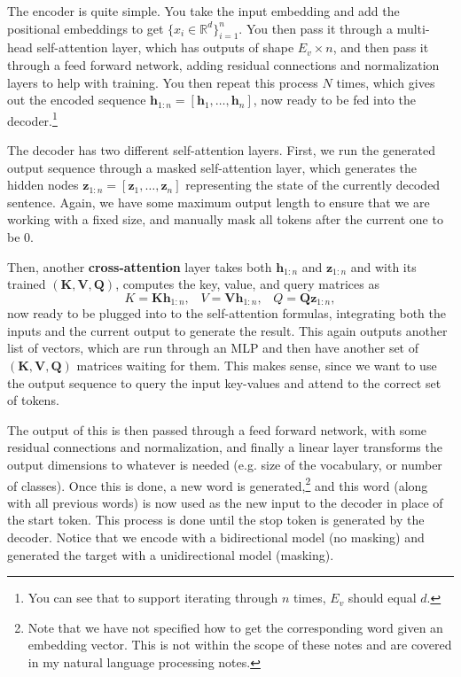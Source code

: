 \documentclass{article}
\begin{document}
      The encoder is quite simple. You take the input embedding and add the positional embeddings to get $\{x_i \in \mathbb{R}^d\}_{i=1}^n$. You then pass it through a multi-head self-attention layer, which has outputs of shape $E_v \times n$, and then pass it through a feed forward network, adding residual connections and normalization layers to help with training. You then repeat this process $N$ times, which gives out the encoded sequence $\mathbf{h}_{1:n} = [\mathbf{h}_1, \ldots, \mathbf{h}_n]$, now ready to be fed into the decoder.\footnote{You can see that to support iterating through $n$ times, $E_v$ should equal $d$.}

      The decoder has two different self-attention layers. First, we run the generated output sequence through a masked self-attention layer, which generates the hidden nodes $\mathbf{z}_{1:n} = [\mathbf{z}_1, \ldots, \mathbf{z}_n]$ representing the state of the currently decoded sentence. Again, we have some maximum output length to ensure that we are working with a fixed size, and manually mask all tokens after the current one to be $0$.

      Then, another \textbf{cross-attention} layer takes both $\mathbf{h}_{1:n}$ and $\mathbf{z}_{1:n}$ and with its trained $(\mathbf{K}, \mathbf{V}, \mathbf{Q})$, computes the key, value, and query matrices as 
      \begin{equation}
        K = \mathbf{K} \mathbf{h}_{1:n}, \;\;\; V = \mathbf{V} \mathbf{h}_{1:n}, \;\;\; Q = \mathbf{Q} \mathbf{z}_{1:n}, 
      \end{equation}
      now ready to be plugged into to the self-attention formulas, integrating both the inputs and the current output to generate the result. This again outputs another list of vectors, which are run through an MLP and then have another set of $(\mathbf{K}, \mathbf{V}, \mathbf{Q})$ matrices waiting for them. This makes sense, since we want to use the output sequence to query the input key-values and attend to the correct set of tokens. 
      
      The output of this is then passed through a feed forward network, with some residual connections and normalization, and finally a linear layer transforms the output dimensions to whatever is needed (e.g. size of the vocabulary, or number of classes). Once this is done, a new word is generated,\footnote{Note that we have not specified how to get the corresponding word given an embedding vector. This is not within the scope of these notes and are covered in my natural language processing notes.} and this word (along with all previous words) is now used as the new input to the decoder in place of the start token. This process is done until the stop token is generated by the decoder. Notice that we encode with a bidirectional model (no masking) and generated the target with a unidirectional model (masking). 
\end{document}
